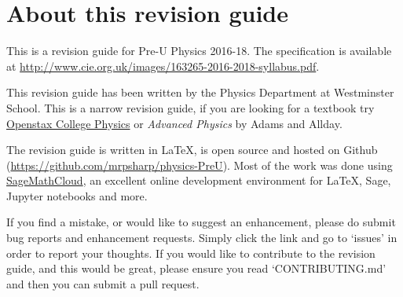 \documentclass[revision-guide.tex]{subfiles}
\begin{document}
\chapter{About this revision guide}

This is a revision guide for Pre-U Physics 2016-18. The specification is available at \url{http://www.cie.org.uk/images/163265-2016-2018-syllabus.pdf}.

This revision guide has been written by the Physics Department at Westminster School. This is a narrow revision guide, if you are looking for a textbook try \href{https://openstax.org/details/books/college-physics}{Openstax College Physics} or \emph{Advanced Physics} by Adams and Allday.

The revision guide is written in \LaTeX, is open source and hosted on Github (\url{https://github.com/mrpsharp/physics-PreU}). Most of the work was done using \href{https://cloud.sagemath.com}{SageMathCloud}, an excellent online development environment for \LaTeX, Sage, Jupyter notebooks and more.


If you find a mistake, or would like to suggest an enhancement, please do submit bug reports and enhancement requests. Simply click the link and go to `issues' in order to report your thoughts. If you would like to contribute to the revision guide, and this would be great, please ensure you read `CONTRIBUTING.md' and then you can submit a pull request.
\end{document}

